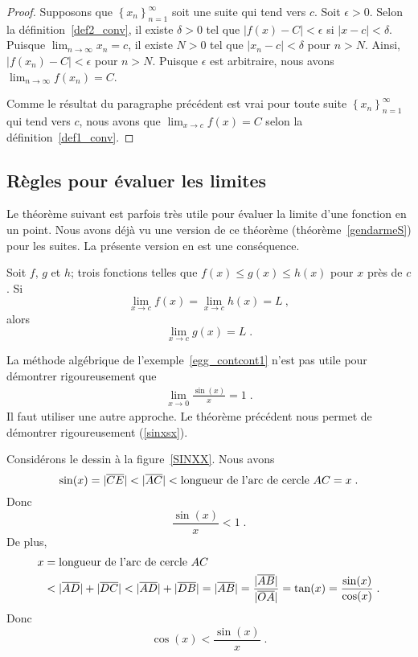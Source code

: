 {\begin{proof}
Supposons que $\displaystyle \left\{ x_n \right\}_{n=1}^\infty$ soit
une suite qui tend vers $c$.  Soit $\epsilon >0$.  Selon la
définition~\ref{def2_conv}, il existe $\delta >0$ tel que
$\displaystyle \left|f(x) -C\right| < \epsilon$ si
$\displaystyle \left|x -c\right| < \delta$.  Puisque
$\displaystyle \lim_{n\rightarrow \infty} x_n = c$, il existe $N>0$
tel que $\displaystyle \left|x_n - c \right| < \delta$ pour $n>N$.
Ainsi,
$\displaystyle \left|f(x_n) -C\right| < \epsilon$ pour $n>N$.  Puisque
$\epsilon$ est arbitraire, nous avons
$\displaystyle \lim_{n\rightarrow \infty} f(x_n) = C$.

Comme le résultat du paragraphe précédent est vrai pour toute suite
$\displaystyle \left\{ x_n \right\}_{n=1}^\infty$ qui tend vers $c$,
nous avons que $\displaystyle \lim_{x\rightarrow c} f(x) = C$ selon la
définition~\ref{def1_conv}.
\end{proof}

\subsection{Règles pour évaluer les limites}

Le théorème suivant est parfois très utile pour évaluer la limite
d'une fonction en un point.  Nous avons déjà vu une version de ce théorème
(théorème~\ref{gendarmeS}) pour les suites.  La présente version
en est une conséquence.

\begin{focus}{\thm}
Soit $f$, $g$ et $h$; trois fonctions telles que
$f(x) \leq g(x) \leq h(x)$ pour $x$ près de $c$.  Si
\[
\lim_{x\rightarrow c} f(x) = \lim_{x\rightarrow c} h(x) = L \ ,
\]
alors
\[
\lim_{x\rightarrow c} g(x) = L \; .
\]
\label{gendarmeF}
\end{focus}

\begin{egg}[\theory]
La méthode algébrique de l'exemple~\ref{egg_contcont1} n'est pas utile
pour démontrer rigoureusement que
\begin{align} \label{sinxsx}
\lim_{x\rightarrow 0} \frac{\sin(x)}{x} = 1 \; .
\end{align}
Il faut utiliser une autre approche.  Le théorème précédent nous
permet de démontrer rigoureusement (\ref{sinxsx}).

Considérons le dessin à la figure~\ref{SINXX}.  Nous avons
\[
\sin(x) = |\overline{CE}| < |\overline{AC}|
< \text{longueur de l'arc de cercle}\ AC = x \; .
\]
Donc
\begin{equation}\label{inequ1}
\frac{\sin(x)}{x} < 1 \; .
\end{equation}
De plus,
\begin{align*}
x &= \text{longueur de l'arc de cercle}\ AC \\
&< |\overline{AD}| + |\overline{DC}| < |\overline{AD}| + |\overline{DB}|
= |\overline{AB}| = \frac{|\overline{AB}|}{|\overline{OA}|}
= \tan(x) = \frac{\sin(x)}{\cos(x)} \; .
\end{align*}
Donc
\begin{equation}\label{inequ2}
\cos(x) < \frac{\sin(x)}{x} \; .
\end{equation}


\end{egg}}
